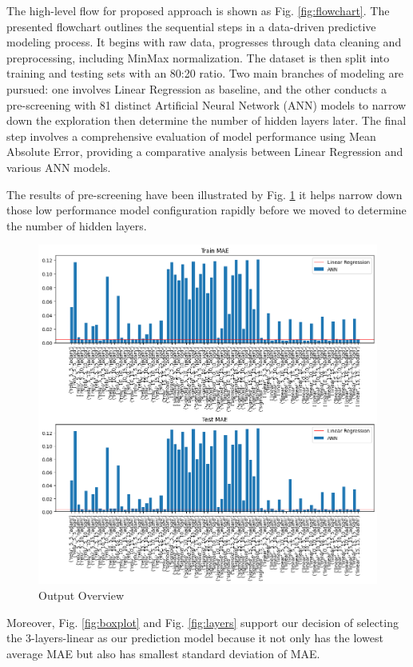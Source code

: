 \documentclass[sigplan,screen]{acmart}
\begin{document}
The high-level flow for proposed approach is shown as Fig. \ref{fig:flowchart}. The presented flowchart outlines the sequential steps in a data-driven predictive modeling process. It begins with raw data, progresses through data cleaning and preprocessing, including MinMax normalization. The dataset is then split into training and testing sets with an 80:20 ratio. Two main branches of modeling are pursued: one involves Linear Regression as baseline, and the other conducts a pre-screening with 81 distinct Artificial Neural Network (ANN) models to narrow down the exploration then determine the number of hidden layers later. The final step involves a comprehensive evaluation of model performance using Mean Absolute Error, providing a comparative analysis between Linear Regression and various ANN models.

The results of pre-screening have been illustrated by Fig. \ref{fig:prescreen_output} it helps narrow down those low performance model configuration rapidly before we moved to determine the number of hidden layers.

\begin{figure}
  \centering
  \includegraphics[width=0.8\linewidth]{prescreening_output.png}
  \caption{Output Overview}
  \label{fig:prescreen_output}
\end{figure}


Moreover, Fig. \ref{fig:boxplot} and Fig. \ref{fig:layers} support our decision of selecting the 3-layers-linear as our prediction model because it not only has the lowest average MAE but also has smallest standard deviation of MAE.
\end{document}
